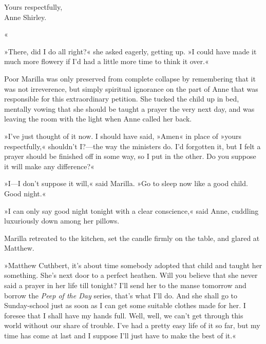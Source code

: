 \begin{flushright}
Yours respectfully,\\
Anne Shirley.\end{flushright}«

»There, did I do all right?« she asked eagerly, getting up. »I could have made it much more flowery if I'd had a little more time to think it over.«

Poor Marilla was only preserved from complete collapse by remembering that it was not irreverence, but simply spiritual ignorance on the part of Anne that was responsible for this extraordinary petition. She tucked the child up in bed, mentally vowing that she should be taught a prayer the very next day, and was leaving the room with the light when Anne called her back.

»I've just thought of it now. I should have said, »Amen« in place of »yours respectfully,« shouldn't I?—the way the ministers do. I'd forgotten it, but I felt a prayer should be finished off in some way, so I put in the other. Do you suppose it will make any difference?«

»I—I don't suppose it will,« said Marilla. »Go to sleep now like a good child. Good night.«

»I can only say good night tonight with a clear conscience,« said Anne, cuddling luxuriously down among her pillows.

Marilla retreated to the kitchen, set the candle firmly on the table, and glared at Matthew.

»Matthew Cuthbert, it's about time somebody adopted that child and taught her something. She's next door to a perfect heathen. Will you believe that she never said a prayer in her life till tonight? I'll send her to the manse tomorrow and borrow the \textit{Peep of the Day} series, that's what I'll do. And she shall go to Sunday-school just as soon as I can get some suitable clothes made for her. I foresee that I shall have my hands full. Well, well, we can't get through this world without our share of trouble. I've had a pretty easy life of it so far, but my time has come at last and I suppose I'll just have to make the best of it.«